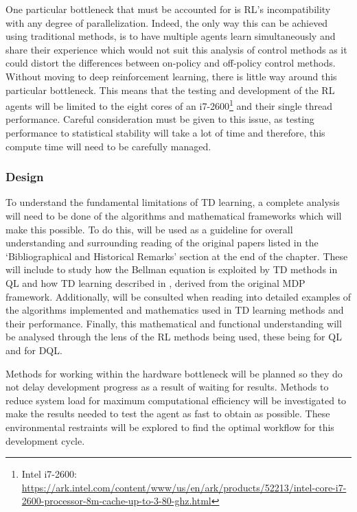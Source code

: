 \documentclass[hidelinks,journal]{IEEEtran}
\begin{document}
One particular bottleneck that must be accounted for is RL’s incompatibility with any degree of parallelization. Indeed, the only way this can be achieved using traditional methods, is to have multiple agents learn simultaneously and share their experience \parencite{Kretchmar02} which would not suit this analysis of control methods as it could distort the differences between on-policy and off-policy control methods. Without moving to deep reinforcement learning, there is little way around this particular bottleneck. This means that the testing and development of the RL agents will be limited to the eight cores of an i7-2600\footnote{Intel i7-2600: \url{https://ark.intel.com/content/www/us/en/ark/products/52213/intel-core-i7-2600-processor-8m-cache-up-to-3-80-ghz.html}} and their single thread performance. Careful consideration must be given to this issue, as testing performance to statistical stability will take a lot of time and therefore, this compute time will need to be carefully managed.
\subsubsection{Design}
\label{subsubsec:devReqDes}
To understand the fundamental limitations of TD learning, a complete analysis will need to be done of the algorithms and mathematical frameworks which will make this possible. To do this,  \textcite[ch. 6]{Sutton18} will be used as a guideline for overall understanding and surrounding reading of the original papers listed in the ‘Bibliographical and Historical Remarks’ section at the end of the chapter. These will include \textcite{Bellman58} to study how the Bellman equation is exploited by TD methods in QL and how TD learning described in \textcite{Sutton87}, derived from the original MDP framework. Additionally, \textcite{Hasselt11} will be consulted when reading into detailed examples of the algorithms implemented and mathematics used in TD learning methods and their performance. Finally, this mathematical and functional understanding will be analysed through the lens of the RL methods being used, these being \textcite{Watkins89, Watkins92} for QL and \textcite{Hasselt10} for DQL.

Methods for working within the hardware bottleneck will be planned so they do not delay development progress as a result of waiting for results. Methods to reduce system load for maximum computational efficiency will be investigated to make the results needed to test the agent as fast to obtain as possible. These environmental restraints will be explored to find the optimal workflow for this development cycle.
\end{document}
